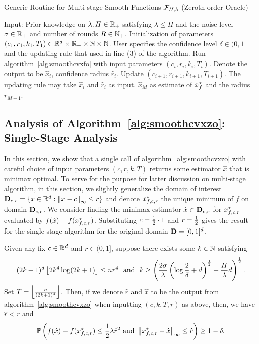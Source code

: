 \begin{algorithm}[htp]
\caption{Generic Routine for Multi-stage Smooth Functions $\mathcal{F}_{H, \lambda}$ (Zeroth-order Oracle)} 
\begin{algorithmic}[1]  
\Statex Input: Prior knowledge on $\lambda, H \in \mathbb{R}_+$ satisfying $\lambda \leq H$ and 
	the noise level $\sigma \in \mathbb{R}_+$ and number of rounds $R \in \mathbb{N}_+$. 
	Initialization of parameters  $(c_1, r_1, k_1, T_1) \in \mathbb{R}^d \times \mathbb{R}_+ \times \mathbb{N} \times \mathbb{N}$. 
	User specifies the confidence level $\delta \in (0, 1]$ and the updating rule that used 
	in line (3) of the algorithm. 
	\State Run algorithm~\ref{alg:smoothcvxfo} with input parameters $(c_i, r_i, k_i, T_i)$.
	Denote the output to be $\hat{x}_i$, confidence radius $\hat{r}_i$. 
	\State Update $(c_{i+1}, r_{i+1}, k_{i+1}, T_{i+1})$. The updating rule may take 
		$\hat{x}_i$ and $\hat{r}_i$ as input.   
\ENDFOR
\State \Return $\hat{x}_M$ as estimate of $x_f^\star$ and the radius $r_{M+1}$.
\end{algorithmic}
\label{alg:smoothcvxzoRrounds}
\end{algorithm}

\subsection{Analysis of Algorithm~\ref{alg:smoothcvxzo}: Single-Stage Analysis}
In this section, we show that a single call of algorithm~\ref{alg:smoothcvxzo} 
with careful choice of input parameters $(c, r, k, T)$ returns some 
estimator $\hat{x}$ that is minimax optimal. To serve for the purpose for latter 
discussion on multi-stage algorithm, in this section, we slightly generalize 
the domain of interest $\mathbf{D}_{c, r} = \{x\in \mathbb{R}^d: \left\|{x-c}\right\|_\infty \leq r\}$ 
and denote $x_{f, c, r}^\star$ the unique minimum of $f$ on domain $\mathbf{D}_{c, r}$.
We consider finding the minimax estimator $\hat{x}\in \mathbf{D}_{c, r}$ for 
$x_{f, c, r}^\star$ evaluated by $f(\hat{x}) - f(x_{f, c, r}^\star)$. Substituting 
$c = \frac{1}{2} \cdot 1$ and $r=\frac{1}{2}$ gives the result for the single-stage algorithm for 
the original domain $\mathbf{D} = [0, 1]^d$.
\begin{proposition}
\label{proposition:zeroth-order-smooth-one-round}
Given any fix $c\in \mathbb{R}^d$ and $r \in (0, 1]$, suppose there exists some $k \in \mathbb{N}$ satisfying 
\begin{equation}
\label{eqn:existence-of-k-one-round-zo}
(2k+1)^d \left\lfloor{2k^4 \log(2k+1)}\right\rfloor \leq nr^4~~\text{and}~~
	k \geq \left(\frac{2\sigma}{\lambda} \left(\log \frac{2}{\delta} + d\right)^{\frac{1}{2}} + \frac{H}{\lambda}d\right)^{\frac{1}{2}}.
\end{equation}
Set $T= \left\lfloor{\frac{n}{(2k+1)^d}}\right\rfloor$. Then, if we denote $\hat{r}$ and 
$\hat{x}$ to be the output from algorithm~\ref{alg:smoothcvxzo} when inputting 
$(c, k, T, r)$ as above, then, we have $\hat{r} < r$ and 
\begin{equation*}
\mathbb{P}\left(f(\hat{x}) - f(x_{f, c, r}^\star) \leq  \frac{1}{2} \lambda \hat{r}^2 ~\text{and}~ 
	\left\|{x_{f, c, r}^\star - \hat{x}}\right\|_\infty \leq \hat{r} \right)\geq 1-\delta.
\end{equation*}
\end{proposition}

